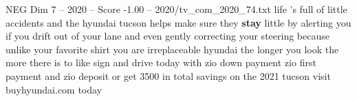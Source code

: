 \begin{textsample}{NEG Dim 7 – 2020 – Score -1.00 – 2020/tv\_com\_2020\_74.txt}  \label{ex:f7_neg_006}
life 's full of little accidents and the hyundai tucson helps make sure they \textbf{stay} little by alerting you if you drift out of your lane and even gently correcting your steering because unlike your favorite shirt you are irreplaceable hyundai the longer you look the more there is to like sign and drive today with zio down payment zio first payment and zio deposit or get 3500 in total savings on the 2021 tucson visit buyhyundai.com today

\end{textsample}
